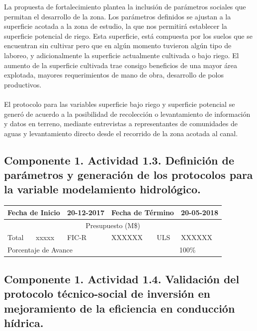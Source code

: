 \documentclass[]{article}
\begin{document}
La propuesta de fortalecimiento plantea la inclusión de parámetros sociales que permitan el desarrollo de la zona. Los parámetros definidos se ajustan a la superficie acotada a la zona de estudio, la que nos permitirá establecer la superficie potencial de riego. Esta superficie, está compuesta por los suelos que se encuentran sin cultivar pero que en algún momento tuvieron algún tipo de laboreo, y adicionalmente la superficie actualmente cultivada o bajo riego. El aumento de la superficie cultivada trae consigo beneficios de una mayor área explotada, mayores requerimientos de mano de obra, desarrollo de polos productivos.\\
\\
El protocolo para las variables superficie bajo riego y superficie potencial se generó de acuerdo a la posibilidad de recolección o levantamiento de información y datos en terreno, mediante entrevistas a representantes de comunidades de aguas y levantamiento directo desde el recorrido de la zona acotada al canal.

\subsection{Componente 1. Actividad 1.3. Definición de parámetros y generación de los protocolos para la variable modelamiento hidrológico.}

\begin{table}[!htb]
\centering
\begin{tabular}{|p{2cm}|p{2cm}|p{2cm}|p{2cm}|p{2cm}|p{2cm}|}
    \hline
    \multicolumn{2}{|l|}{Fecha de Inicio} & 20-12-2017 & \multicolumn{2}{l|}{Fecha de Término} & 20-05-2018\\
    \hline
    \multicolumn{6}{|c|}{Presupuesto (M\$)}\\
    \hline
    Total & xxxxx & FIC-R & XXXXXX & ULS & XXXXXX\\
    \hline
    \multicolumn{4}{|l|}{Porcentaje de Avance} & \multicolumn{2}{c|}{100\%}\\
    \hline
\end{tabular}
\end{table}


\subsection{Componente 1. Actividad 1.4. Validación del protocolo técnico-social de inversión en mejoramiento de la eficiencia en conducción hídrica.}
\end{document}
